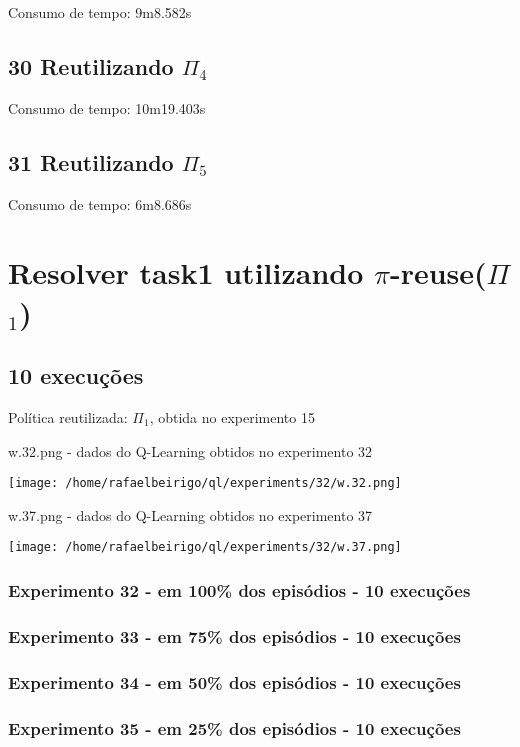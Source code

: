 \documentclass[11pt]{article}
\begin{document}
Consumo de tempo: 9m8.582s
\subsection{30 Reutilizando $\Pi$$_4$}
\label{sec-9.4}

Consumo de tempo: 10m19.403s
\subsection{31 Reutilizando $\Pi$$_5$}
\label{sec-9.5}

Consumo de tempo: 6m8.686s


\section{Resolver task1 utilizando $\pi$-reuse($\Pi$$_1$)}
\label{sec-10}

\subsection{10 execuções}
\label{sec-10.1}

Política reutilizada: $\Pi$$_1$, obtida no experimento 15

w.32.png - dados do Q-Learning obtidos no experimento 32
\centerline{\texttt{[image: /home/rafaelbeirigo/ql/experiments/32/w.32.png]}}


w.37.png - dados do Q-Learning obtidos no experimento 37
\centerline{\texttt{[image: /home/rafaelbeirigo/ql/experiments/32/w.37.png]}}


\subsubsection{Experimento 32 - em 100\% dos episódios - 10 execuções}
\label{sec-10.1.1}

\subsubsection{Experimento 33 - em  75\% dos episódios - 10 execuções}
\label{sec-10.1.2}

\subsubsection{Experimento 34 - em  50\% dos episódios - 10 execuções}
\label{sec-10.1.3}

\subsubsection{Experimento 35 - em  25\% dos episódios - 10 execuções}
\label{sec-10.1.4}
\end{document}
